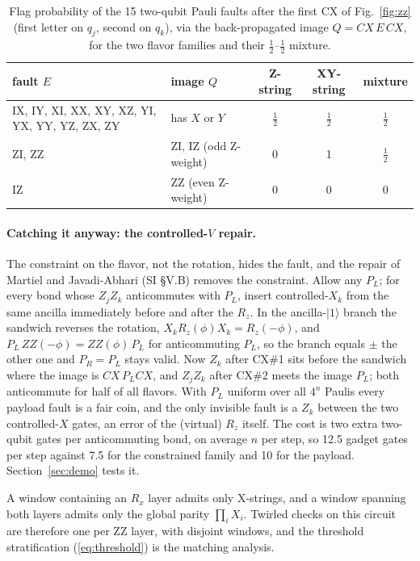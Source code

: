 \documentclass[11pt,a4paper]{article}
\theoremstyle{remark}
\begin{document}
\begin{table}[h]
\centering\small
\caption{Flag probability of the 15 two-qubit Pauli faults after the first CX of Fig.~\ref{fig:zz} (first letter on $q_j$, second on $q_k$), via the back-propagated image $Q=CX\,E\,CX$, for the two flavor families and their $\tfrac12$--$\tfrac12$ mixture.}
\label{tab:fifteen}
\begin{tabular}{p{4.2cm}lccc}
\toprule
fault $E$ & image $Q$ & Z-string & XY-string & mixture \\
\midrule
IX, IY, XI, XX, XY, XZ, YI, YX, YY, YZ, ZX, ZY & has $X$ or $Y$ & $\tfrac12$ & $\tfrac12$ & $\tfrac12$ \\
ZI, ZZ & ZI, IZ (odd Z-weight) & 0 & 1 & $\tfrac12$ \\
IZ & ZZ (even Z-weight) & 0 & 0 & 0 \\
\bottomrule
\end{tabular}
\end{table}

\paragraph{Catching it anyway: the controlled-$V$ repair.} The constraint on the flavor, not the rotation, hides the fault, and the repair of Martiel and Javadi-Abhari (SI \S V.B) removes the constraint. Allow any $P_L$; for every bond whose $Z_jZ_k$ anticommutes with $P_L$, insert controlled-$X_k$ from the same ancilla immediately before and after the $R_z$. In the ancilla-$|1\rangle$ branch the sandwich reverses the rotation, $X_kR_z(\phi)X_k=R_z(-\phi)$, and $P_L\,ZZ(-\phi)=ZZ(\phi)\,P_L$ for anticommuting $P_L$, so the branch equals $\pm$ the other one and $P_R=P_L$ stays valid. Now $Z_k$ after CX\#1 sits before the sandwich where the image is $CX\,P_LCX$, and $Z_jZ_k$ after CX\#2 meets the image $P_L$; both anticommute for half of all flavors. With $P_L$ uniform over all $4^n$ Paulis every payload fault is a fair coin, and the only invisible fault is a $Z_k$ between the two controlled-$X$ gates, an error of the (virtual) $R_z$ itself. The cost is two extra two-qubit gates per anticommuting bond, on average $n$ per step, so 12.5 gadget gates per step against 7.5 for the constrained family and 10 for the payload. Section~\ref{sec:demo} tests it.

A window containing an $R_x$ layer admits only X-strings, and a window spanning both layers admits only the global parity $\prod_iX_i$. Twirled checks on this circuit are therefore one per ZZ layer, with disjoint windows, and the threshold stratification (\ref{eq:threshold}) is the matching analysis.
\end{document}
